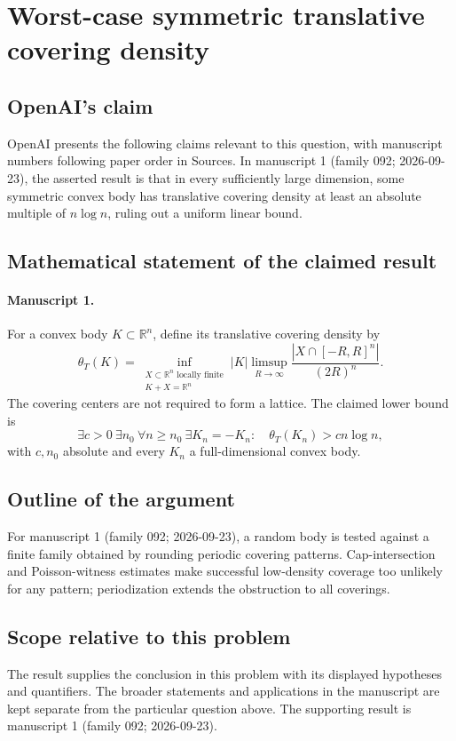 \documentclass[11pt]{article}
\begin{document}
\section*{Worst-case symmetric translative covering density}

\subsection{OpenAI's claim}
OpenAI presents the following claims relevant to this question, with manuscript numbers following paper order in Sources. In manuscript 1 (family 092; 2026-09-23), the asserted result is that in every sufficiently large dimension, some symmetric convex body has translative covering density at least an absolute multiple of $n\log n$, ruling out a uniform linear bound.

\subsection{Mathematical statement of the claimed result}
\paragraph{Manuscript 1.}
For a convex body $K\subset\mathbb R^n$, define its translative covering density by
\[
 \theta_T(K)=\inf_{\substack{X\subset\mathbb R^n\text{ locally finite}\\K+X=\mathbb R^n}}
 |K|\limsup_{R\to\infty}\frac{|X\cap[-R,R]^n|}{(2R)^n}.
\]
The covering centers are not required to form a lattice. The claimed lower bound is
\[
 \exists c>0\ \exists n_0\ \forall n\ge n_0\ \exists K_n=-K_n:
 \quad\theta_T(K_n)>c n\log n,
\]
with $c,n_0$ absolute and every $K_n$ a full-dimensional convex body.

\subsection{Outline of the argument}
For manuscript 1 (family 092; 2026-09-23), a random body is tested against a finite family obtained by rounding periodic covering patterns. Cap-intersection and Poisson-witness estimates make successful low-density coverage too unlikely for any pattern; periodization extends the obstruction to all coverings.

\subsection{Scope relative to this problem}
The result supplies the conclusion in this problem with its displayed hypotheses and quantifiers. The broader statements and applications in the manuscript are kept separate from the particular question above. The supporting result is manuscript 1 (family 092; 2026-09-23).
\end{document}
